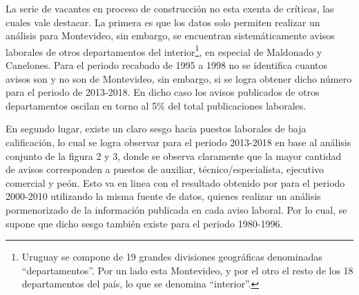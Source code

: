 

La serie de vacantes en proceso de construcción no esta exenta de críticas, las cuales vale destacar. La primera es que los datos solo permiten realizar un análisis para Montevideo, sin embargo, se encuentran sistemáticamente avisos laborales de otros departamentos del interior\footnote{Uruguay se compone de 19 grandes divisiones geográficas denominadas ``departamentos''. Por un lado esta Montevideo, y por el otro el resto de los 18 departamentos del país, lo que se denomina ``interior''.}, en especial de Maldonado y Canelones. Para el periodo recabado de 1995 a 1998 no se identifica cuantos avisos son y no son de Montevideo, sin embargo, si se logra obtener dicho número para el periodo de 2013-2018. En dicho caso los avisos publicados de otros departamentos oscilan en torno al 5\% del total publicaciones laborales. 

En segundo lugar, existe un claro sesgo hacia puestos laborales de baja calificación, lo cual se logra observar para el periodo 2013-2018 en base al análisis conjunto de la figura 2 y 3, donde se observa claramente que la mayor cantidad de avisos corresponden a puestos de auxiliar, técnico/especialista, ejecutivo comercial y peón. Esto va en linea con el resultado obtenido por \cite{Alma2011} para el periodo 2000-2010 utilizando la misma fuente de datos, quienes realizar un análisis pormenorizado de la información publicada en cada aviso laboral. Por lo cual, se supone que dicho sesgo también existe para el periodo 1980-1996.

